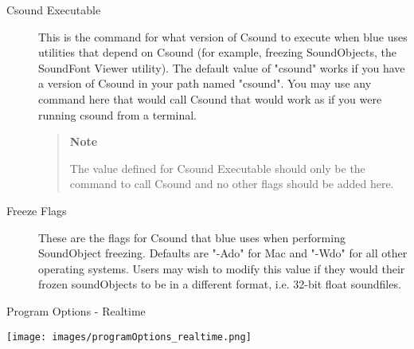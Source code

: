 \begin{description}
\item[Csound Executable]
This is the command for what version of Csound to execute when blue uses
utilities that depend on Csound (for example, freezing SoundObjects, the
SoundFont Viewer utility). The default value of "csound" works if you
have a version of Csound in your path named "csound". You may use any
command here that would call Csound that would work as if you were
running csound from a terminal.

\begin{quote}
\textbf{Note}

The value defined for Csound Executable should only be the command to
call Csound and no other flags should be added here.
\end{quote}
\item[Freeze Flags]
These are the flags for Csound that blue uses when performing
SoundObject freezing. Defaults are "-Ado" for Mac and "-Wdo" for all
other operating systems. Users may wish to modify this value if they
would their frozen soundObjects to be in a different format, i.e. 32-bit
float soundfiles.
\end{description}

Program Options - Realtime

\texttt{[image: images/programOptions\_realtime.png]}

